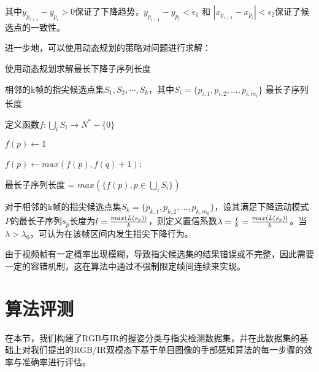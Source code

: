 其中$y_{p_{i+1}} - y_{p_i} > 0$保证了下降趋势，$y_{p_{i+1}} - y_{p_i} < \epsilon_1$ 和 $|x_{p_{i+1}} - x_{p_i}| < \epsilon_2$保证了候选点的一致性。

进一步地，可以使用动态规划的策略对问题进行求解：

\begin{algorithm}
\caption{使用动态规划求解最长下降子序列长度}
\begin{algorithmic}
\Require 相邻的k帧的指尖候选点集$S_1, S_2, \cdots, S_k$，其中$S_i = \{p_{i,1}, p_{i,2}, ... , p_{i,m_i}\}$
\Ensure 最长子序列长度

定义函数$f: \bigcup_i S_i \rightarrow N^*-\{0\} $

    
        \State $f(p) \leftarrow 1$
        
        
            
                \State $f(p) \leftarrow max(f(p), f(q)+1)$;
                
            \EndIf
        
        \EndFor
        
    \EndFor
    
\EndFor

最长子序列长度 = $max(\{f(p), p \in \bigcup_i S_i\})$

\end{algorithmic}
\end{algorithm}

对于相邻的k帧的指尖候选点集$S_k = \{p_{k,1}, p_{k,2}, ... , p_{k,m_k}\}$，设其满足下降运动模式$P$的最长子序列$s_p$长度为$l={max(L(s_p)) \over k} $，则定义置信系数$\lambda={l \over k}={max(L(s_p)) \over k}$。当$\lambda > \lambda_0$，可认为在该帧区间内发生指尖下降行为。

由于视频帧有一定概率出现模糊，导致指尖候选集的结果错误或不完整，因此需要一定的容错机制，这在算法中通过不强制限定帧间连续来实现。

\section{算法评测}

在本节，我们构建了RGB与IR的握姿分类与指尖检测数据集，并在此数据集的基础上对我们提出的RGB/IR双模态下基于单目图像的手部感知算法的每一步骤的效率与准确率进行评估。

